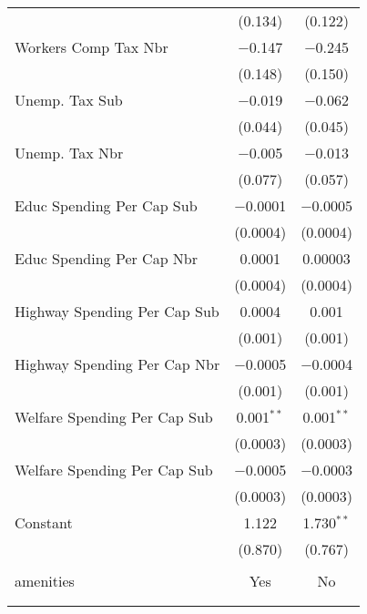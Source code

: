 \begin{table}[!htbp]
\begin{tabular}{@{\extracolsep{5pt}}lcc}
  & (0.134) & (0.122) \\ 
  Workers Comp Tax Nbr & $-$0.147 & $-$0.245 \\ 
  & (0.148) & (0.150) \\ 
  Unemp. Tax Sub & $-$0.019 & $-$0.062 \\ 
  & (0.044) & (0.045) \\ 
  Unemp. Tax Nbr & $-$0.005 & $-$0.013 \\ 
  & (0.077) & (0.057) \\ 
  Educ Spending Per Cap Sub & $-$0.0001 & $-$0.0005 \\ 
  & (0.0004) & (0.0004) \\ 
  Educ Spending Per Cap Nbr & 0.0001 & 0.00003 \\ 
  & (0.0004) & (0.0004) \\ 
  Highway Spending Per Cap Sub & 0.0004 & 0.001 \\ 
  & (0.001) & (0.001) \\ 
  Highway Spending Per Cap Nbr & $-$0.0005 & $-$0.0004 \\ 
  & (0.001) & (0.001) \\ 
  Welfare Spending Per Cap Sub & 0.001$^{**}$ & 0.001$^{**}$ \\ 
  & (0.0003) & (0.0003) \\ 
  Welfare Spending Per Cap Sub & $-$0.0005 & $-$0.0003 \\ 
  & (0.0003) & (0.0003) \\ 
  Constant & 1.122 & 1.730$^{**}$ \\ 
  & (0.870) & (0.767) \\ 
 \hline \\[-1.8ex] 
amenities & Yes & No \\ 
\hline \\[-1.8ex] 
\hline 
\hline \\[-1.8ex] 
\end{tabular} 
\end{table} 
